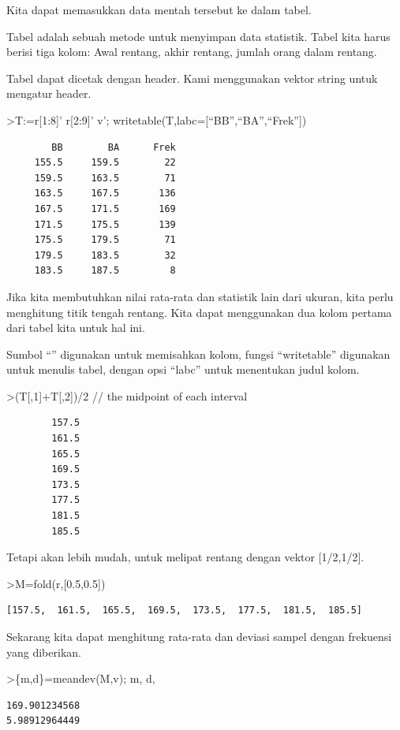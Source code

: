 \documentclass[
]{book}
\begin{document}
Kita dapat memasukkan data mentah tersebut ke dalam tabel.

Tabel adalah sebuah metode untuk menyimpan data statistik. Tabel kita harus berisi tiga kolom: Awal rentang, akhir rentang, jumlah orang dalam rentang.

Tabel dapat dicetak dengan header. Kami menggunakan vektor string untuk mengatur header.

\textgreater T:=r{[}1:8{]}' \textbar{} r{[}2:9{]}' \textbar{} v'; writetable(T,labc={[}``BB'',``BA'',``Frek''{]})

\begin{verbatim}
        BB        BA      Frek
     155.5     159.5        22
     159.5     163.5        71
     163.5     167.5       136
     167.5     171.5       169
     171.5     175.5       139
     175.5     179.5        71
     179.5     183.5        32
     183.5     187.5         8
\end{verbatim}

Jika kita membutuhkan nilai rata-rata dan statistik lain dari ukuran, kita perlu menghitung titik tengah rentang. Kita dapat menggunakan dua kolom pertama dari tabel kita untuk hal ini.

Sumbol ``\textbar{}'' digunakan untuk memisahkan kolom, fungsi ``writetable'' digunakan untuk menulis tabel, dengan opsi ``labc'' untuk menentukan judul kolom.

\textgreater(T{[},1{]}+T{[},2{]})/2 // the midpoint of each interval

\begin{verbatim}
        157.5 
        161.5 
        165.5 
        169.5 
        173.5 
        177.5 
        181.5 
        185.5 
\end{verbatim}

Tetapi akan lebih mudah, untuk melipat rentang dengan vektor {[}1/2,1/2{]}.

\textgreater M=fold(r,{[}0.5,0.5{]})

\begin{verbatim}
[157.5,  161.5,  165.5,  169.5,  173.5,  177.5,  181.5,  185.5]
\end{verbatim}

Sekarang kita dapat menghitung rata-rata dan deviasi sampel dengan frekuensi yang diberikan.

\textgreater\{m,d\}=meandev(M,v); m, d,

\begin{verbatim}
169.901234568
5.98912964449
\end{verbatim}
\end{document}
